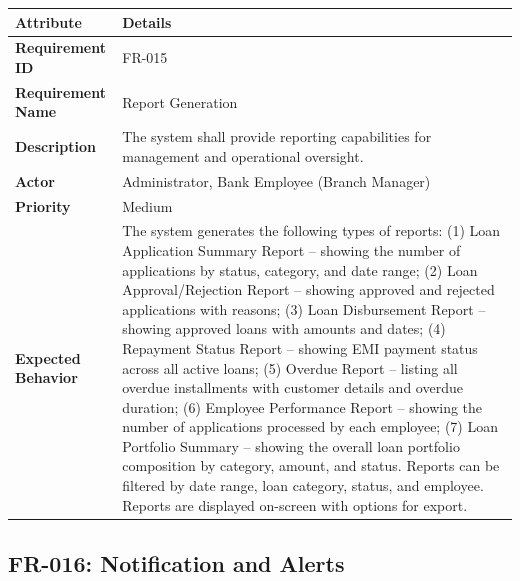 \documentclass[12pt,a4paper,oneside]{report}
\begin{document}
\begin{table}[htbp]
\centering
\small
\begin{tabularx}{\textwidth}{l l}
\toprule
\textbf{Attribute} & \textbf{Details} \\
\midrule
\textbf{Requirement ID} & FR-015 \\
\textbf{Requirement Name} & Report Generation \\
\textbf{Description} & The system shall provide reporting capabilities for management and operational oversight. \\
\textbf{Actor} & Administrator, Bank Employee (Branch Manager) \\
\textbf{Priority} & Medium \\
\textbf{Expected Behavior} & The system generates the following types of reports: (1) Loan Application Summary Report – showing the number of applications by status, category, and date range; (2) Loan Approval/Rejection Report – showing approved and rejected applications with reasons; (3) Loan Disbursement Report – showing approved loans with amounts and dates; (4) Repayment Status Report – showing EMI payment status across all active loans; (5) Overdue Report – listing all overdue installments with customer details and overdue duration; (6) Employee Performance Report – showing the number of applications processed by each employee; (7) Loan Portfolio Summary – showing the overall loan portfolio composition by category, amount, and status. Reports can be filtered by date range, loan category, status, and employee. Reports are displayed on-screen with options for export. \\
\bottomrule
\end{tabularx}
\end{table}

\subsection{FR-016: Notification and Alerts}
\end{document}
